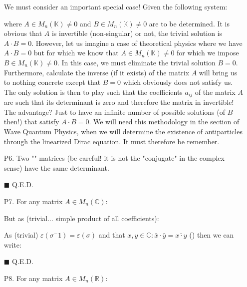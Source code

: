 \begin{enumerate}
		We must consider an important special case! Given the following system:
		
		where $A\in M_n(\mathbb{K})\neq 0$ and $B\in M_n(\mathbb{K})\neq 0$ are to be determined. It is obvious that $A$ is invertible (non-singular) or not, the trivial solution is $A\cdot B=0$. However, let us imagine a case of theoretical physics where we have $A\cdot B=0$ but for which we know that $A\in M_n(\mathbb{K})\neq 0$ for which we impose $B\in M_n(\mathbb{K})\neq 0$. In this case, we must eliminate the trivial solution $B=0$. Furthermore, calculate the inverse (if it exists) of the matrix $A$ will bring us to nothing concrete except that $B=0$ which obviously does not satisfy us. The only solution is then to play such that the coefficients $a_{ij}$ of the matrix $A$ are such that its determinant is zero and therefore the matrix in invertible! The advantage? Just to have an infinite number of possible solutions (of $B$ then!) that satisfy $A\cdot B=0$. We will need this methodology in the section of Wave Quantum Physics, when we will determine the existence of antiparticles through the linearized Dirac equation. It must therefore be remember.
		
		\item[P6.] Two "" matrices (be careful! it is not the "conjugate" in the complex sense) have the same determinant.
		\begin{dem}
		
		
		\begin{flushright}
			$\blacksquare$  Q.E.D.
		\end{flushright}
		\end{dem}
		
		\item[P7.] For any matrix $A\in M_n(\mathbb{C})$:
		\begin{dem}
		
		But as (trivial... simple product of all coefficients):
		
		As (trivial) $\varepsilon(\sigma^-1)=\varepsilon(\sigma)$ and that $x,y\in\mathbb{C}:\bar{x}\cdot \bar{y}=\overline{x\cdot y}$ () then we can write:
		
		\begin{flushright}
			$\blacksquare$  Q.E.D.
		\end{flushright}
		\end{dem}
		
		\item[P8.] For any matrix $A\in M_n(\mathbb{R})$:
		

\end{enumerate}
